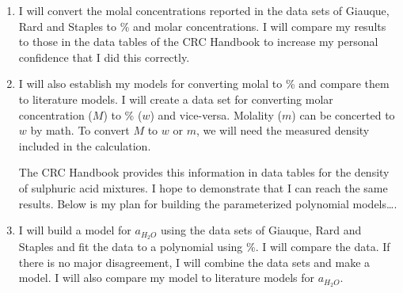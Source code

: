 \documentclass[]{tufte-handout}
\begin{document}
%
\begin{enumerate}

\item I will convert the molal concentrations reported in the data sets of Giauque, Rard and Staples to \% and molar concentrations. I will compare my results to those in the data tables of the CRC Handbook to increase my personal confidence that I did this correctly. 

\item I will also establish my models for converting molal to \% and compare them to literature models. I will create a data set for converting molar concentration ($M$) to \% ($w$) and vice-versa. Molality ($m$) can be concerted to $w$ by math. To convert $M$ to $w$ or $m$, we will need the measured density included in the calculation. 

The CRC Handbook
provides this information in data tables for the density of sulphuric acid mixtures. I hope to demonstrate that I can reach the same results.  Below is my plan for building the parameterized polynomial models\ldots.  


\item I will build a model for $a_{H_2O}$ using the data sets of Giauque, Rard and Staples and fit the data to a polynomial using \%. I will compare the data. If there is no major disagreement, I will combine the data sets and make a model. I will also compare my model to literature models for $a_{H_2O}$. 


\end{enumerate}
\end{document}
